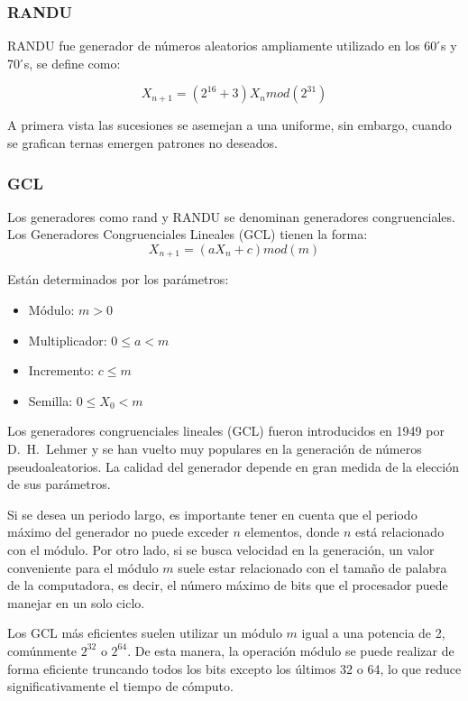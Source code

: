\documentclass{article}
\begin{document}
\subsubsection{RANDU}
RANDU fue generador de números aleatorios ampliamente utilizado en los 60 ́s y 70 ́s, se
define como:

\begin{equation}
    X_{n+1} = (2^{16} + 3)X_n mod(2^{31})
\end{equation}

A primera vista las sucesiones se asemejan a una uniforme, sin embargo, cuando se grafican
ternas emergen patrones no deseados.

\subsubsection{GCL}

Los generadores como rand y RANDU se denominan generadores congruenciales. Los Generadores Congruenciales Lineales (GCL) tienen la forma:
\begin{equation}
    X_{n+1} = (aX_n + c)mod(m)
\end{equation}

Están determinados por los parámetros: 
\begin{itemize}
    \item Módulo: $m>0$ 
    \item Multiplicador: $0 \leq a < m$
    \item Incremento: $c \leq m$
    \item Semilla: $0 \leq X_0 < m$
\end{itemize}

Los generadores congruenciales lineales (GCL) fueron introducidos en 1949 por D.~H.~Lehmer y se han vuelto muy populares en la generación de números pseudoaleatorios. La calidad del generador depende en gran medida de la elección de sus parámetros.

Si se desea un periodo largo, es importante tener en cuenta que el periodo máximo del generador no puede exceder \( n \) elementos, donde \( n \) está relacionado con el módulo. Por otro lado, si se busca velocidad en la generación, un valor conveniente para el módulo \( m \) suele estar relacionado con el tamaño de palabra de la computadora, es decir, el número máximo de bits que el procesador puede manejar en un solo ciclo.

Los GCL más eficientes suelen utilizar un módulo \( m \) igual a una potencia de 2, comúnmente \( 2^{32} \) o \( 2^{64} \). De esta manera, la operación módulo se puede realizar de forma eficiente truncando todos los bits excepto los últimos 32 o 64, lo que reduce significativamente el tiempo de cómputo.
\end{document}
